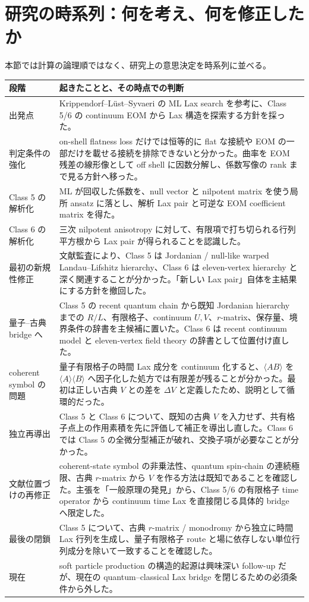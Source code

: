 \section{研究の時系列：何を考え、何を修正したか}
\label{sec:chronology}
本節では計算の論理順ではなく、研究上の意思決定を時系列に並べる。

\begin{longtable}{L{24mm}L{118mm}}
\toprule
段階 & 起きたことと、その時点での判断\\
\midrule\endhead
出発点 & Krippendorf--L\"ust--Syvaeri の ML Lax search を参考に、Class 5/6 の continuum EOM から Lax 構造を探索する方針を採った\cite{KLS2021}。\\
判定条件の強化 & on-shell flatness loss だけでは恒等的に flat な接続や EOM の一部だけを載せる接続を排除できないと分かった。曲率を EOM 残差の線形像として off shell に因数分解し、係数写像の rank まで見る方針へ移った。\\
Class 5 の解析化 & ML が回収した係数を、null vector と nilpotent matrix を使う局所 ansatz に落とし、解析 Lax pair と可逆な EOM coefficient matrix を得た。\\
Class 6 の解析化 & 三次 nilpotent anisotropy に対して、有限項で打ち切られる行列平方根から Lax pair が得られることを認識した。\\
最初の新規性修正 & 文献監査により、Class 5 は Jordanian / null-like warped Landau--Lifshitz hierarchy、Class 6 は eleven-vertex hierarchy と深く関連することが分かった。「新しい Lax pair」自体を主結果にする方針を撤回した。\\
量子--古典 bridge へ & Class 5 の recent quantum chain から既知 Jordanian hierarchy までの $R/L$、有限格子、continuum $U,V$、$r$-matrix、保存量、境界条件の辞書を主候補に置いた。Class 6 は recent continuum model と eleven-vertex field theory の辞書として位置付け直した。\\
coherent symbol の問題 & 量子有限格子の時間 Lax 成分を continuum 化すると、$\langle AB\rangle$ を $\langle A\rangle\langle B\rangle$ へ因子化した処方では有限差が残ることが分かった。最初は正しい古典 $V$ との差を $\Delta V$ と定義したため、説明として循環的だった。\\
独立再導出 & Class 5 と Class 6 について、既知の古典 $V$ を入力せず、共有格子点上の作用素積を先に評価して補正を導出し直した。Class 6 では Class 5 の全微分型補正が破れ、交換子項が必要なことが分かった。\\
文献位置づけの再修正 & coherent-state symbol の非乗法性、quantum spin-chain の連続極限、古典 $r$-matrix から $V$ を作る方法は既知であることを確認した。主張を「一般原理の発見」から、Class 5/6 の有限格子 time operator から continuum time Lax を直接閉じる具体的 bridge へ限定した。\\
最後の閉鎖 & Class 5 について、古典 $r$-matrix / monodromy から独立に時間 Lax 行列を生成し、量子有限格子 route と場に依存しない単位行列成分を除いて一致することを確認した。\\
現在 & soft particle production の構造的起源は興味深い follow-up だが、現在の quantum--classical Lax bridge を閉じるための必須条件から外した。\\
\bottomrule
\end{longtable}

